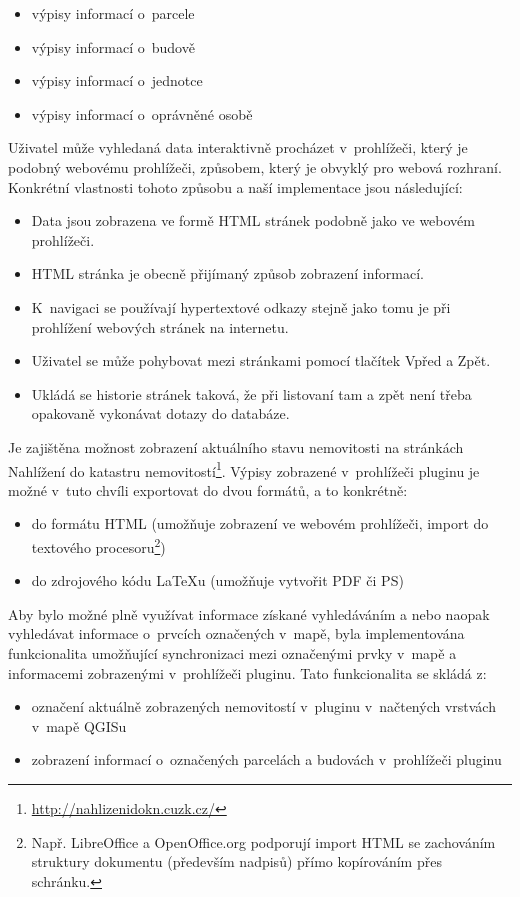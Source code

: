 \documentclass[a4paper,12pt]{article}
\begin{document}
\begin{itemize}
        \item výpisy informací o~parcele
        \item výpisy informací o~budově
        \item výpisy informací o~jednotce
        \item výpisy informací o~oprávněné osobě
\end{itemize}
Uživatel může vyhledaná data interaktivně procházet v~prohlížeči, který je podobný webovému prohlížeči,
způsobem, který je obvyklý pro webová rozhraní.
Konkrétní vlastnosti tohoto způsobu a naší implementace jsou následující:
\begin{itemize}
\item Data jsou zobrazena ve formě HTML stránek podobně jako ve webovém prohlížeči.
\item HTML stránka je obecně přijímaný způsob zobrazení informací.
\item K~navigaci se používají hypertextové odkazy stejně jako tomu je při prohlížení webových stránek na internetu.
\item Uživatel se může pohybovat mezi stránkami pomocí tlačítek Vpřed a Zpět.
\item Ukládá se historie stránek taková, že při listovaní tam a zpět není třeba opakovaně vykonávat dotazy do databáze.
\end{itemize}
Je zajištěna možnost zobrazení aktuálního stavu nemovitosti na stránkách Nahlížení do katastru nemovitostí\footnote{\url{http://nahlizenidokn.cuzk.cz/}}.
Výpisy zobrazené v~prohlížeči pluginu je možné v~tuto chvíli exportovat do dvou formátů, a to konkrétně:

\begin{itemize}
\item do formátu HTML (umožňuje zobrazení ve webovém prohlížeči, import do textového procesoru\footnote{Např. LibreOffice a OpenOffice.org podporují import HTML se zachováním struktury dokumentu (především nadpisů) přímo kopírováním přes schránku.})
\item do zdrojového kódu LaTeXu (umožňuje vytvořit PDF či PS)
\end{itemize}

Aby bylo možné plně využívat informace získané vyhledáváním a nebo naopak vyhledávat informace o~prvcích označených v~mapě, byla implementována funkcionalita umožňující synchronizaci mezi označenými prvky v~mapě a informacemi zobrazenými v~prohlížeči pluginu. Tato funkcionalita se skládá z:
\begin{itemize}
\item označení aktuálně zobrazených nemovitostí v~pluginu v~načtených vrstvách v~mapě QGISu
\item zobrazení informací o~označených parcelách a budovách v~prohlížeči pluginu
\end{itemize}
\end{document}
